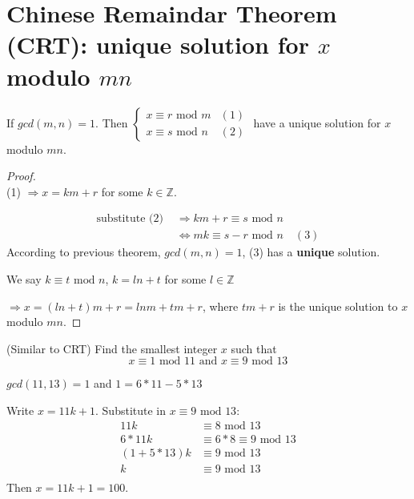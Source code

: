 \documentclass[11pt]{elegantbook}
\begin{document}
\section{Chinese Remaindar Theorem (CRT): unique solution for $x$ modulo $mn$}
\begin{theorem}
\quad

If $gcd(m,n)=1$. Then $\left\{\begin{matrix}
    x\equiv r \text{ mod }m& (1)\\
    x\equiv s \text{ mod }n& (2)
\end{matrix}\right.$ have a unique solution for $x$ modulo $mn$.
\end{theorem}
\begin{proof}
\quad\\
(1) $\Rightarrow x=km+r$ for some $k\in \mathbb{Z}$.

\begin{equation}
    \begin{aligned}
        \text{substitute (2) }&\Rightarrow	km+r\equiv s \text{ mod }n\\ &\Leftrightarrow	mk\equiv s-r \text{ mod }n\quad (3)
    \end{aligned}
    \nonumber
\end{equation}
According to previous theorem, $gcd(m,n)=1$, (3) has a \textbf{unique} solution.

We say $k\equiv t \text{ mod }n$, $k=ln+t$ for some $l\in \mathbb{Z}$

$\Rightarrow x=(ln+t)m+r=lnm+tm+r$, where $tm+r$ is the unique solution to $x$ modulo $mn$.
\end{proof}

\begin{example}(Similar to CRT)
Find the smallest integer $x$ such that $$x\equiv 1 \text{ mod }11\text{ and }x\equiv  9\text{ mod }13$$
\end{example}
$gcd(11,13)=1$ and $1=6*11-5*13$

Write $x=11k+1$. Substitute in $x\equiv 9 \text{ mod }13$:
\begin{equation}
    \begin{aligned}
        11k&\equiv 8 \text{ mod }13\\
        6*11k&\equiv 6*8\equiv 9 \text{ mod }13\\
        (1+5*13)k&\equiv 9 \text{ mod }13\\
        k&\equiv 9 \text{ mod }13\\
    \end{aligned}
    \nonumber
\end{equation}
Then $x=11k+1=100$.
\end{document}
